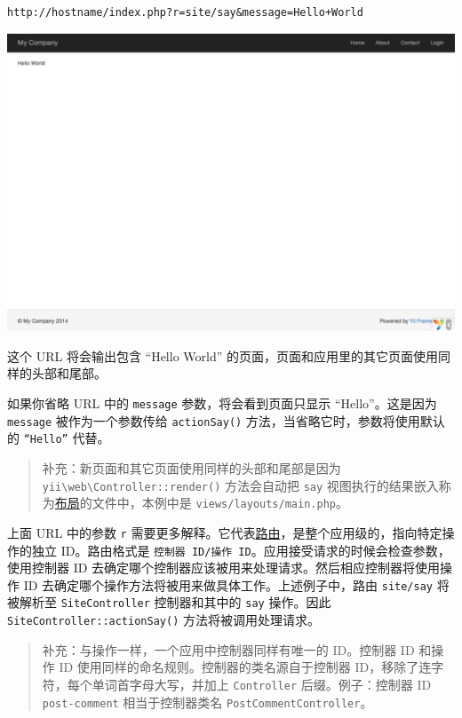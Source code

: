 \begin{lstlisting}
http://hostname/index.php?r=site/say&message=Hello+World
\end{lstlisting}
\noindent\includegraphics[width=\textwidth]{images/start-hello-world.png}

这个 URL 将会输出包含 “Hello World” 的页面，页面和应用里的其它页面使用同样的头部和尾部。

如果你省略 URL 中的 \lstinline|message| 参数，将会看到页面只显示 “Hello”。这是因为 \lstinline|message| 被作为一个参数传给 \lstinline|actionSay()| 方法，当省略它时，参数将使用默认的 \lstinline|“Hello”| 代替。

\begin{quote}补充：新页面和其它页面使用同样的头部和尾部是因为 \texttt{yii{\allowbreak{}\textbackslash}web{\allowbreak{}\textbackslash}Controller\allowbreak{}::\allowbreak{}render()} 方法会自动把 \lstinline|say| 视图执行的结果嵌入称为\hyperref[structure-views.md::layouts]{布局}的文件中，本例中是 \lstinline|views/layouts/main.php|。

\end{quote}
上面 URL 中的参数 \lstinline|r| 需要更多解释。它代表\hyperref[runtime-routing.md]{路由}，是整个应用级的，指向特定操作的独立 ID。路由格式是 \lstinline|控制器 ID/操作 ID|。应用接受请求的时候会检查参数，使用控制器 ID 去确定哪个控制器应该被用来处理请求。然后相应控制器将使用操作 ID 去确定哪个操作方法将被用来做具体工作。上述例子中，路由 \lstinline|site/say| 将被解析至 \lstinline|SiteController| 控制器和其中的 \lstinline|say| 操作。因此 \lstinline|SiteController::actionSay()| 方法将被调用处理请求。

\begin{quote}补充：与操作一样，一个应用中控制器同样有唯一的 ID。控制器 ID 和操作 ID 使用同样的命名规则。控制器的类名源自于控制器 ID，移除了连字符，每个单词首字母大写，并加上 \lstinline|Controller| 后缀。例子：控制器 ID \lstinline|post-comment| 相当于控制器类名 \lstinline|PostCommentController|。

\end{quote}
